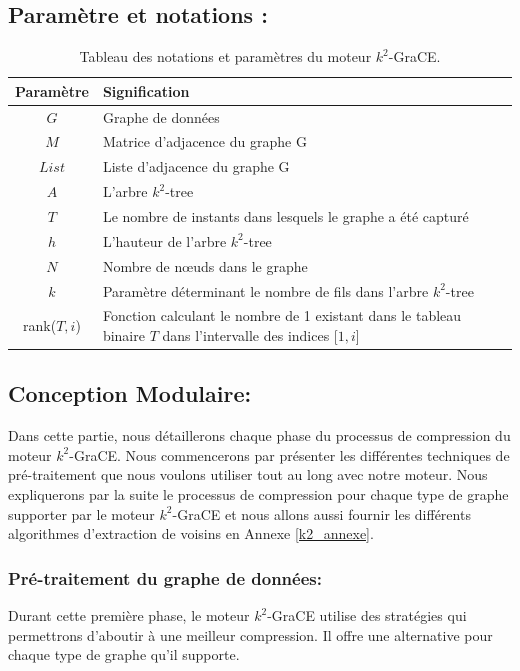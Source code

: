 \documentclass[a4paper,oneside,12pt]{report}
\theoremstyle{definition}
\begin{document}
		\subsection{Paramètre et notations :}
				
		\begin{table}[H]
		\centering
		\begin{tabular}{|c|L{12cm}|}
		\hline Paramètre & Signification \\ \hline\hline 
		$G$ & Graphe de données \\ \hline
		$M$ & Matrice d'adjacence du graphe G\\ \hline
		$List$ & Liste d'adjacence du graphe G\\ \hline
		$A$ & L'arbre $k^2$-tree \\\hline
		$T$ & Le nombre de instants dans lesquels le graphe a été capturé \\\hline
		$h$ & L'hauteur de l'arbre $k^2$-tree \\ \hline
		$N$ & Nombre de nœuds dans le graphe \\ \hline
		$k$ & Paramètre déterminant le nombre de fils dans l'arbre $k^2$-tree\\ \hline
		rank($T,i$) &  Fonction calculant le nombre de 1 existant dans le tableau binaire $T$ dans l'intervalle des indices [$1,i$] \\ \hline
		\end{tabular}
		\caption{Tableau des notations et paramètres du moteur $k^2$-GraCE.}	
		\label{notk2grace}		
	\end{table}
	
		\subsection{Conception Modulaire:}
		
		Dans cette partie, nous détaillerons chaque phase du processus de compression du moteur $k^2$-GraCE. Nous commencerons par présenter les différentes techniques de pré-traitement 
		que nous voulons utiliser tout au long avec notre moteur. Nous expliquerons par la suite le processus de compression pour chaque type de graphe supporter par le moteur $k^2$-GraCE et nous allons aussi fournir les différents algorithmes d'extraction de voisins en Annexe \ref{k2_annexe}. 
		
			\subsubsection{Pré-traitement du graphe de données:}
Durant cette première phase, le moteur $k^2$-GraCE utilise des stratégies qui permettrons d'aboutir à une meilleur compression. Il offre une alternative pour chaque type de graphe qu'il supporte. 		
			
\end{document}
